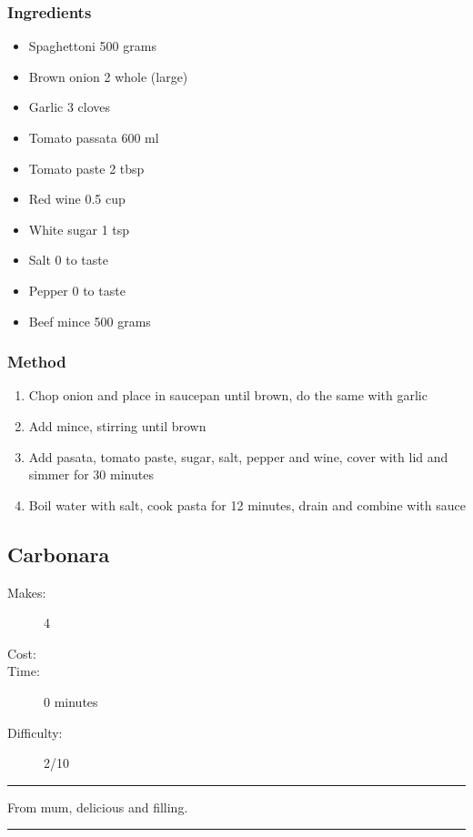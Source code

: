\documentclass[]{article}
\begin{document}
\subsubsection*{\Large Ingredients}
\begin{multicols}{2}
\begin{itemize}
 \item Spaghettoni \hfill 500 grams
 \item Brown onion \hfill 2 whole (large)
 \item Garlic \hfill 3 cloves
 \item Tomato passata \hfill 600 ml
 \item Tomato paste \hfill 2 tbsp
 \item Red wine \hfill 0.5 cup
 \item White sugar \hfill 1 tsp
 \item Salt \hfill 0 to taste
 \item Pepper \hfill 0 to taste
 \item Beef mince \hfill 500 grams
\end{itemize}
\end{multicols}
\subsubsection*{\Large Method}
\begin{enumerate}[font=\huge\color{accent}]
	\item Chop onion and place in saucepan until brown, do the same with garlic
	\item Add mince, stirring until brown
	\item Add pasata, tomato paste, sugar, salt, pepper and wine, cover with lid and simmer for 30 minutes
	\item Boil water with salt, cook pasta for 12 minutes, drain and combine with sauce
\end{enumerate}
\newpage
{}\label{rec:Carbonara}
\subsection*{\center\huge Carbonara}
\begin{description}
\item[Makes:] 4 
\item[Cost:] \textdollar
\item[Time:] 0 minutes
\item[Difficulty:] 2/10
\end{description}
\vspace{0.2cm}\hrule\vspace{0.5cm}
\begin{adjustwidth}{0.5 cm}{0.5 cm}

From mum, delicious and filling. \hfill\color{accent}{\Large\faTruck\hspace{0.1cm}}\color{black}

\end{adjustwidth}
\vspace{0.5cm}\hrule
\end{document}
